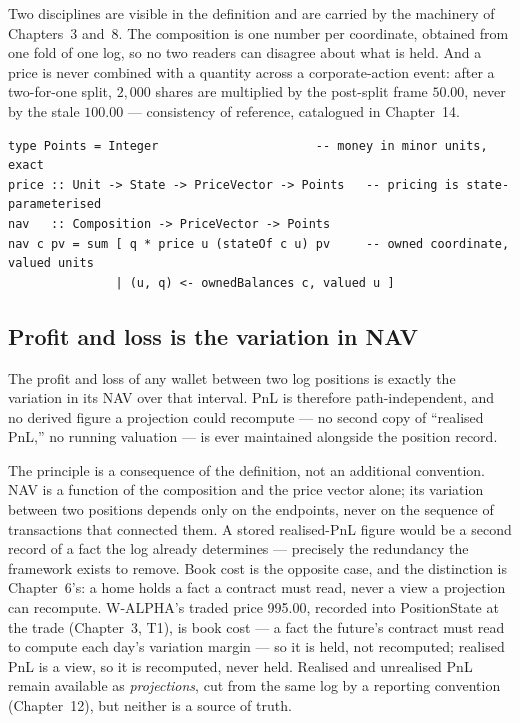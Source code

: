 Two disciplines are visible in the definition and are carried by the machinery
of Chapters~3 and~8. The composition is one number per coordinate, obtained
from one fold of one log, so no two readers can disagree about what is held.
And a price is never combined with a quantity across a corporate-action event:
after a two-for-one split, $2{,}000$ shares are multiplied by the post-split
frame $50.00$, never by the stale $100.00$ --- consistency of reference,
catalogued in Chapter~14.

\begin{lstlisting}
type Points = Integer                      -- money in minor units, exact
price :: Unit -> State -> PriceVector -> Points   -- pricing is state-parameterised
nav   :: Composition -> PriceVector -> Points
nav c pv = sum [ q * price u (stateOf c u) pv     -- owned coordinate, valued units
               | (u, q) <- ownedBalances c, valued u ]
\end{lstlisting}

\subsection{Profit and loss is the variation in NAV}\label{sec:pnl}

\begin{principle}
The profit and loss of any wallet between two log positions is exactly the
variation in its NAV over that interval. PnL is therefore path-independent,
and no derived figure a projection could recompute --- no second copy of
``realised PnL,'' no running valuation --- is ever maintained alongside the
position record.
\end{principle}

The principle is a consequence of the definition, not an additional
convention. NAV is a function of the composition and the price vector alone;
its variation between two positions depends only on the endpoints, never on
the sequence of transactions that connected them. A stored realised-PnL figure
would be a second record of a fact the log already determines --- precisely
the redundancy the framework exists to remove. Book cost is the opposite
case, and the distinction is Chapter~6's: a home holds a fact a contract must
read, never a view a projection can recompute. W-ALPHA's traded price 995.00,
recorded into PositionState at the trade (Chapter~3, T1), is book cost --- a
fact the future's contract must read to compute each day's variation margin
--- so it is held, not recomputed; realised PnL is a view, so it is
recomputed, never held. Realised and unrealised PnL
remain available as \emph{projections}, cut from the same log by a reporting
convention (Chapter~12), but neither is a source of truth.

